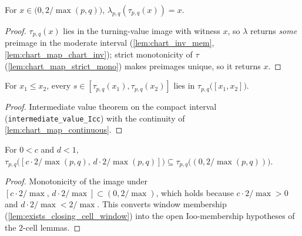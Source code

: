 \begin{lemma}

\leanok
[left round-trip identity $\lambda \circ \tau = \mathrm{id}$]
  \label{lem:chart_inv_chart_map}
  For $x \in \bigl(0, 2/\max(p,q)\bigr)$,
  $\lambda_{p,q}(\tau_{p,q}(x)) = x$.
\end{lemma}
\begin{proof}

\leanok
  $\tau_{p,q}(x)$ lies in the turning-value image with witness $x$, so
  $\lambda$ returns \emph{some} preimage in the moderate interval
  (\cref{lem:chart_inv_mem}, \cref{lem:chart_map_chart_inv}); strict
  monotonicity of $\tau$ (\cref{lem:chart_map_strict_mono}) makes preimages
  unique, so it returns $x$.
\end{proof}

\begin{lemma}

  \label{lem:chart_map_mem_image_icc}
  For $x_1 \le x_2$, every $s \in [\tau_{p,q}(x_1), \tau_{p,q}(x_2)]$ lies in
  $\tau_{p,q}\bigl([x_1, x_2]\bigr)$.
\end{lemma}
\begin{proof}

\leanok
  Intermediate value theorem on the compact interval
  (\texttt{intermediate\_value\_Icc}) with the continuity of
  \cref{lem:chart_map_continuous}.
\end{proof}

\begin{lemma}

  \label{lem:chart_map_image_window_subset}
  For $0 < c$ and $d < 1$,
  $\tau_{p,q}\bigl([c \cdot 2/\max(p,q),\, d \cdot 2/\max(p,q)]\bigr) \subseteq
  \tau_{p,q}\bigl((0, 2/\max(p,q))\bigr)$.
\end{lemma}
\begin{proof}

\leanok
  Monotonicity of the image under
  $[c\cdot 2/\max,\, d\cdot 2/\max] \subset (0, 2/\max)$, which holds because
  $c \cdot 2/\max > 0$ and $d \cdot 2/\max < 2/\max$. This converts window
  membership (\cref{lem:exists_closing_cell_window}) into the open
  $\mathrm{Ioo}$-membership hypotheses of the $2$-cell lemmas.
\end{proof}

